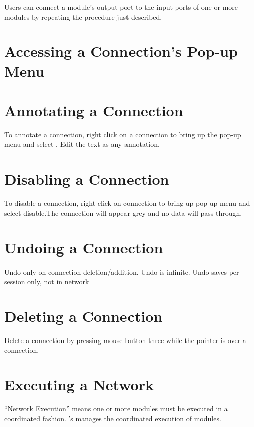 Users can connect a module's output port to the input ports of one or more
modules by repeating the procedure just described.

\section{Accessing a Connection's Pop-up Menu}
\label{sec:connectionmenu}

\section{Annotating a Connection}
\label{sec:annotatemods}

To annotate a connection, right click on a connection to bring up the pop-up 
menu and select . Edit the text as any annotation.

\section{Disabling a Connection}
\label{sec:disablemods}

To disable a connection, right click on connection to bring up pop-up
menu and select disable.The connection will appear grey and no data
will pass through.

\section{Undoing a Connection}
\label{sec:undomod}

Undo only on connection deletion/addition. Undo is infinite. Undo
saves per session only, not in network

\section{Deleting a Connection}
\label{sec:deleteconnections}

Delete a connection by pressing mouse button three while the pointer is
over a connection.

\section{Executing a Network}
\label{sec:executenet}

``Network Execution'' means one or more modules must be executed in a
coordinated fashion. 
\sr{}'s  manages the coordinated execution of modules.

